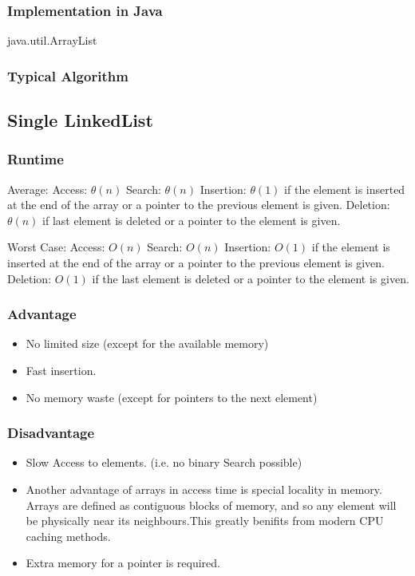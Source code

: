 \documentclass[12pt,a4paper]{article}
\newcommand{\RuntimeHead}{Runtime}
\newcommand{\AdvantageHead}{Advantage}
\newcommand{\DisadvantageHead}{Disadvantage}
\newcommand{\ImplementationInJavaHead}{Implementation in Java}
\newcommand{\TypicalAlgorithmHead}{Typical Algorithm}
\begin{document}
\subsubsection{\ImplementationInJavaHead}
java.util.ArrayList
\subsubsection{\TypicalAlgorithmHead}

\subsection{Single LinkedList}

\subsubsection{\RuntimeHead}
Average: 
Access: $\theta(n)  $
Search: $\theta(n) $
Insertion: $ \theta(1)$ if the element is inserted at the end of the array or a pointer to the previous element is given.
Deletion: $\theta (n)$ if last element is deleted or a pointer to the element is given.

Worst Case: 
Access: $O(n)$  
Search: $O(n) $
Insertion: $O(1)$ if the element is inserted at the end of the array or a pointer to the previous element is given.
Deletion: $O(1)$ if the last element is deleted or a pointer to the element is given.
\subsubsection{\AdvantageHead}
\begin{itemize}
\item No limited size (except for the available memory)
\item Fast insertion. 
\item No memory waste (except for pointers to the next element)
\end{itemize}
\subsubsection{\DisadvantageHead}
\begin{itemize}
\item Slow Access to elements. (i.e. no binary Search possible)
\item Another advantage of arrays in access time is special locality in memory. Arrays are defined as contiguous blocks of memory, and so any element will be physically near its neighbours.This greatly benifits from modern CPU caching methods.
\item Extra memory for a pointer is required.
\end{itemize}
\end{document}
